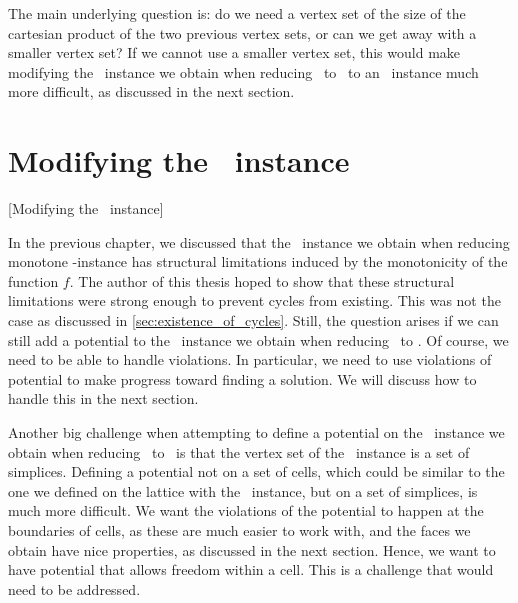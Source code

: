 The main underlying question is: do we need a vertex set of the size of the cartesian product of the two previous vertex sets, or can we get away with a smaller vertex set? If we cannot use a smaller vertex set, this would make modifying the \EndOfLine\ instance we obtain when reducing \Tarskistar\ to \EndOfLine\ to an \EndOfPotentialLine\ instance much more difficult, as discussed in the next section.

\section{Modifying the \EndOfLine\ instance}[Modifying the \EndOfLine\ instance]

In the previous chapter, we discussed that the \EndOfLine\ instance we obtain when reducing monotone \Tarskistar-instance has structural limitations induced by the monotonicity of the function $f$. The author of this thesis hoped to show that these structural limitations were strong enough to prevent cycles from existing. This was not the case as discussed in \cref{sec:existence_of_cycles}. Still, the question arises if we can still add a potential to the \EndOfLine\ instance we obtain when reducing \Tarskistar\ to \EndOfLine\@. Of course, we need to be able to handle violations. In particular, we need to use violations of potential to make progress toward finding a solution. We will discuss how to handle this in the next section.

Another big challenge when attempting to define a potential on the \EndOfLine\ instance we obtain when reducing \Tarskistar\ to \EndOfLine\ is that the vertex set of the \EndOfLine\ instance is a set of simplices. Defining a potential not on a set of cells, which could be similar to the one we defined on the lattice with the \Localopt\ instance, but on a set of simplices, is much more difficult. We want the violations of the potential to happen at the boundaries of cells, as these are much easier to work with, and the faces we obtain have nice properties, as discussed in the next section. Hence, we want to have potential that allows freedom within a cell. This is a challenge that would need to be addressed.

